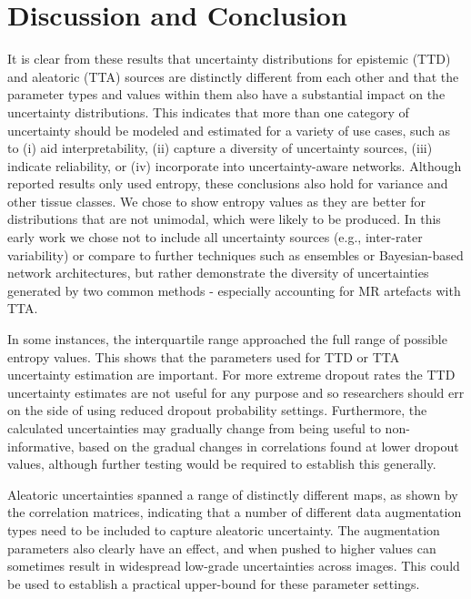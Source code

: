 \documentclass[runningheads]{llncs}
\begin{document}
\section{Discussion and Conclusion}

It is clear from these results that uncertainty distributions for epistemic (TTD) and aleatoric (TTA) sources are distinctly different from each other and that the parameter types and values within them also have a substantial impact on the uncertainty distributions. This indicates that more than one category of uncertainty should be modeled and estimated for a variety of use cases, such as to (i) aid interpretability, (ii) capture a diversity of uncertainty sources, (iii) indicate reliability, or (iv) incorporate into uncertainty-aware networks. Although reported results only used entropy, these conclusions also hold for variance and other tissue classes. We chose to show entropy values as they are better for distributions that are not unimodal, which were likely to be produced. In this early work we chose not to include all uncertainty sources (e.g., inter-rater variability) or compare to further techniques such as ensembles or Bayesian-based network architectures, but rather demonstrate the diversity of uncertainties generated by two common methods - especially accounting for MR artefacts with TTA.

In some instances, the interquartile range approached the full range of possible entropy values. This shows that the parameters used for TTD or TTA uncertainty estimation are important. For more extreme dropout rates the TTD uncertainty estimates are not useful for any purpose and so researchers should err on the side of using reduced dropout probability settings. Furthermore, the calculated uncertainties may gradually change from being useful to non-informative, based on the gradual changes in correlations found at lower dropout values, although further testing would be required to establish this generally.

Aleatoric uncertainties spanned a range of distinctly different maps, as shown by the correlation matrices, indicating that a number of different data augmentation types need to be included to capture aleatoric uncertainty. The augmentation parameters also clearly have an effect, and when pushed to higher values can sometimes result in widespread low-grade uncertainties across images. This could be used to establish a practical upper-bound for these parameter settings.
\end{document}
